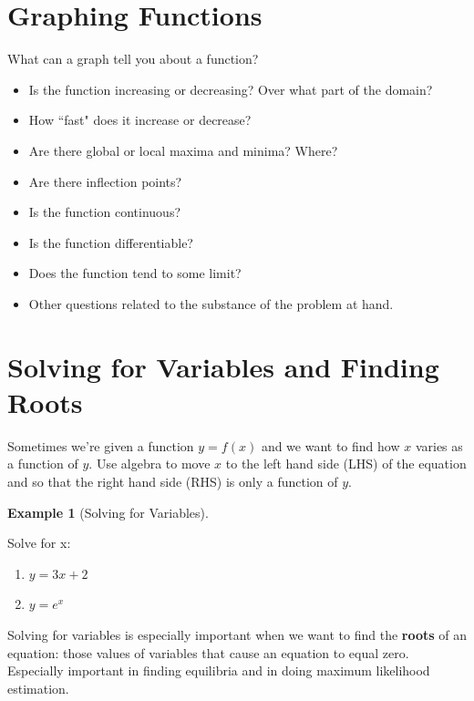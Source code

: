 \documentclass[
]{book}
\providecommand{\tightlist}{%
  \setlength{\itemsep}{0pt}\setlength{\parskip}{0pt}}
\theoremstyle{definition}
\theoremstyle{definition}
\newtheorem{example}{Example}[chapter]
\theoremstyle{definition}
\theoremstyle{definition}
\theoremstyle{remark}
\begin{document}
\hypertarget{graphing-functions}{%
\section{Graphing Functions}\label{graphing-functions}}

What can a graph tell you about a function?

\begin{itemize}
\tightlist
\item
  Is the function increasing or decreasing? Over what part of the domain?
\item
  How ``fast" does it increase or decrease?
\item
  Are there global or local maxima and minima? Where?
\item
  Are there inflection points?
\item
  Is the function continuous?
\item
  Is the function differentiable?
\item
  Does the function tend to some limit?
\item
  Other questions related to the substance of the problem at hand.
\end{itemize}

\hypertarget{solving-for-variables-and-finding-roots}{%
\section{Solving for Variables and Finding Roots}\label{solving-for-variables-and-finding-roots}}

Sometimes we're given a function \(y=f(x)\) and we want to find how \(x\) varies as a function of \(y\). Use algebra to move \(x\) to the left hand side (LHS) of the equation and so that the right hand side (RHS) is only a function of \(y\).

\begin{example}[Solving for Variables]
\protect\hypertarget{exm:solvevar}{}{\label{exm:solvevar} {} }

Solve for x:

\begin{enumerate}
\def\labelenumi{\arabic{enumi}.}
\item
  \(y=3x+2\)
\item
  \(y=e^x\)
\end{enumerate}
\end{example}

Solving for variables is especially important when we want to find the \textbf{roots} of an equation: those values of variables that cause an equation to equal zero. Especially important in finding equilibria and in doing maximum likelihood estimation.
\end{document}
